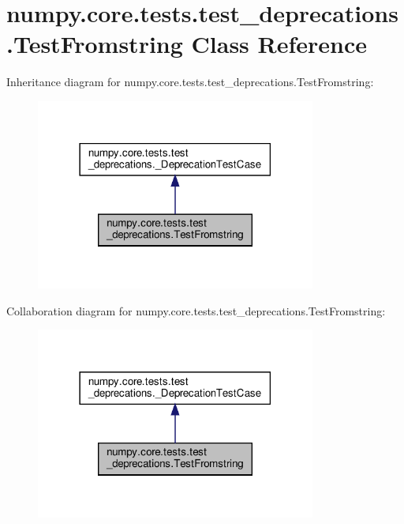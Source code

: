 \hypertarget{classnumpy_1_1core_1_1tests_1_1test__deprecations_1_1TestFromstring}{}\section{numpy.\+core.\+tests.\+test\+\_\+deprecations.\+Test\+Fromstring Class Reference}
\label{classnumpy_1_1core_1_1tests_1_1test__deprecations_1_1TestFromstring}


Inheritance diagram for numpy.\+core.\+tests.\+test\+\_\+deprecations.\+Test\+Fromstring\+:
\nopagebreak
\begin{figure}[H]
\begin{center}
\leavevmode
\includegraphics[width=261pt]{classnumpy_1_1core_1_1tests_1_1test__deprecations_1_1TestFromstring__inherit__graph}
\end{center}
\end{figure}


Collaboration diagram for numpy.\+core.\+tests.\+test\+\_\+deprecations.\+Test\+Fromstring\+:
\nopagebreak
\begin{figure}[H]
\begin{center}
\leavevmode
\includegraphics[width=261pt]{classnumpy_1_1core_1_1tests_1_1test__deprecations_1_1TestFromstring__coll__graph}
\end{center}
\end{figure}
